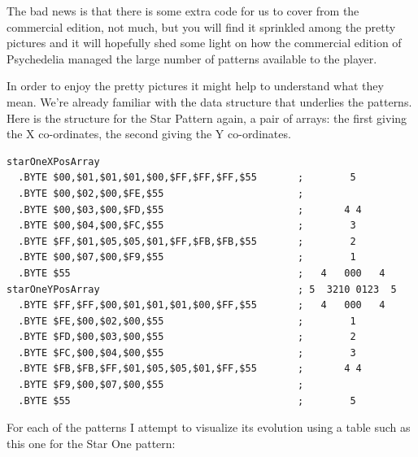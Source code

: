The bad news is that there is some extra code for us to cover from the commercial edition, not much,
but you will find it sprinkled among the pretty pictures and it will hopefully shed some light
on how the commercial edition of Psychedelia managed the large number of patterns available to the
player.

\clearpage
In order to enjoy the pretty pictures it might help to understand what they mean. We're already 
familiar with the data structure that underlies the patterns. Here is the structure for the Star
Pattern again, a pair of arrays: the first giving the X co-ordinates, the second giving the Y
co-ordinates.
\begin{lstlisting}[caption=Source code for the Star.]
starOneXPosArray  
  .BYTE $00,$01,$01,$01,$00,$FF,$FF,$FF,$55       ;        5       
  .BYTE $00,$02,$00,$FE,$55                       ;                
  .BYTE $00,$03,$00,$FD,$55                       ;       4 4      
  .BYTE $00,$04,$00,$FC,$55                       ;        3       
  .BYTE $FF,$01,$05,$05,$01,$FF,$FB,$FB,$55       ;        2       
  .BYTE $00,$07,$00,$F9,$55                       ;        1       
  .BYTE $55                                       ;   4   000   4  
starOneYPosArray                                  ; 5  3210 0123  5  
  .BYTE $FF,$FF,$00,$01,$01,$01,$00,$FF,$55       ;   4   000   4  
  .BYTE $FE,$00,$02,$00,$55                       ;        1       
  .BYTE $FD,$00,$03,$00,$55                       ;        2       
  .BYTE $FC,$00,$04,$00,$55                       ;        3       
  .BYTE $FB,$FB,$FF,$01,$05,$05,$01,$FF,$55       ;       4 4      
  .BYTE $F9,$00,$07,$00,$55                       ;                
  .BYTE $55                                       ;        5       
\end{lstlisting}

For each of the patterns I attempt to visualize its evolution using a table such as this one for 
the Star One pattern:

